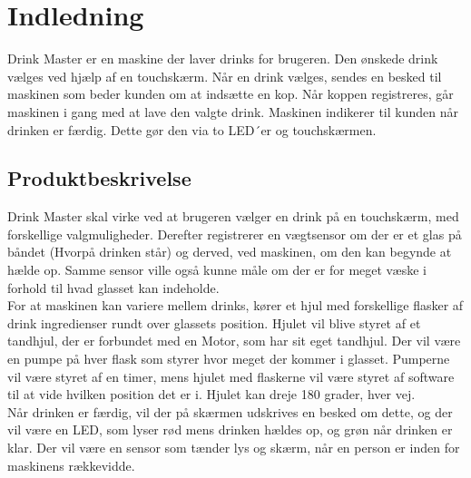 \chapter{Indledning}
Drink Master er en maskine der laver drinks for brugeren. Den ønskede drink vælges ved hjælp af en touchskærm. Når en drink vælges, sendes en besked til maskinen som beder kunden om at indsætte en kop. Når koppen registreres, går maskinen i gang med at lave den valgte drink. Maskinen indikerer til kunden når drinken er færdig. Dette gør den via to LED´er og touchskærmen. 
\section{Produktbeskrivelse}
Drink Master skal virke ved at brugeren vælger en drink på en touchskærm, med forskellige valgmuligheder. Derefter registrerer en vægtsensor om der er et glas på båndet (Hvorpå drinken står) og derved, ved maskinen, om den kan begynde at hælde op. Samme sensor ville også kunne måle om der er for meget væske i forhold til hvad glasset kan indeholde.\\
For at maskinen kan variere mellem drinks, kører et hjul med forskellige flasker af drink ingredienser rundt over glassets position. Hjulet vil blive styret af et tandhjul, der er forbundet med en Motor, som har sit eget tandhjul. Der vil være en pumpe på hver flask som styrer hvor meget der kommer i glasset. Pumperne vil være styret af en timer, mens hjulet med flaskerne vil være styret af software til at vide hvilken position det er i. Hjulet kan dreje 180 grader, hver vej.\\
Når drinken er færdig, vil der på skærmen udskrives en besked om dette, og der vil være en LED, som lyser rød mens drinken hældes op, og grøn når drinken er klar. Der vil være en sensor som tænder lys og skærm, når en person er inden for maskinens rækkevidde. 

